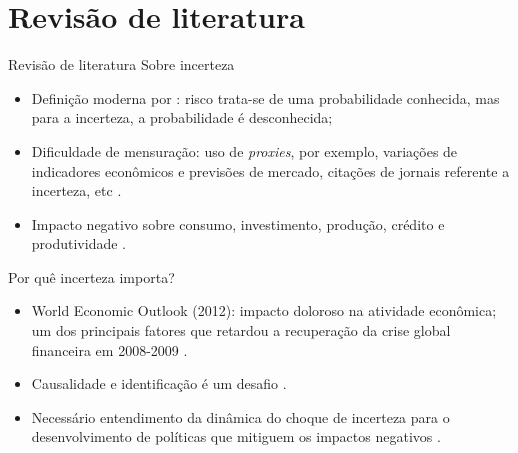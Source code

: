 \documentclass[aspectratio=169, 10pt]{beamer}
\begin{document}
\section{Revisão de literatura}
\begin{frame}{Revisão de literatura}
Sobre incerteza
\begin{itemize}
    \item Definição moderna por : risco trata-se de uma probabilidade conhecida, mas para a incerteza, a probabilidade é desconhecida;
    \item Dificuldade de mensuração: uso de \textit{proxies}, por exemplo, variações de indicadores econômicos e previsões de mercado, citações de jornais referente a incerteza, etc \cite{FMI2012outlook, bloom2014fluctuations}.
     \item Impacto negativo sobre consumo, investimento, produção, crédito e produtividade \cite{haddow2013macroeconomic}. 
\end{itemize}
Por quê incerteza importa?
\begin{itemize}
    \item World Economic Outlook (2012): impacto doloroso na atividade econômica; um dos principais fatores que retardou a recuperação da crise global financeira em 2008-2009 \cite{FMI2012outlook}.
    \item Causalidade e identificação é um desafio \cite{baker2016measuring, ludvigson2021uncertainty}.
     \item Necessário entendimento da dinâmica do choque de incerteza para o desenvolvimento de políticas que mitiguem os impactos negativos \cite{haddow2013macroeconomic}.  
\end{itemize}

\end{frame}
\end{document}
